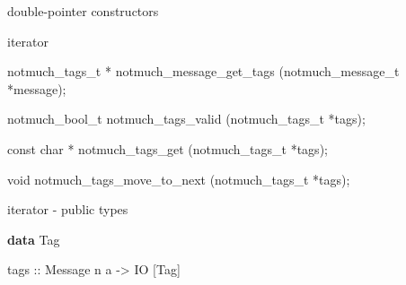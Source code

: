 \documentclass[ignorenonframetext,aspectratio=169]{beamer}
\newenvironment{Shaded}{}{}
\newcommand{\KeywordTok}[1]{\textcolor[rgb]{0.00,0.44,0.13}{\textbf{{#1}}}}
\newcommand{\DataTypeTok}[1]{\textcolor[rgb]{0.56,0.13,0.00}{{#1}}}
\newcommand{\DecValTok}[1]{\textcolor[rgb]{0.25,0.63,0.44}{{#1}}}
\newcommand{\StringTok}[1]{\textcolor[rgb]{0.25,0.44,0.63}{{#1}}}
\newcommand{\OtherTok}[1]{\textcolor[rgb]{0.00,0.44,0.13}{{#1}}}
\newcommand{\FunctionTok}[1]{\textcolor[rgb]{0.02,0.16,0.49}{{#1}}}
\newcommand{\NormalTok}[1]{{#1}}
\begin{document}
\begin{frame}[fragile]{double-pointer constructors}

\begin{Shaded}
\end{Shaded}

\end{frame}

\begin{frame}[fragile]{iterator}

\begin{Shaded}
\begin{Highlighting}[]
\NormalTok{notmuch_tags_t *}
\NormalTok{notmuch_message_get_tags (notmuch_message_t *message);}

\NormalTok{notmuch_bool_t}
\NormalTok{notmuch_tags_valid (notmuch_tags_t *tags);}

\DataTypeTok{const} \DataTypeTok{char} \NormalTok{*}
\NormalTok{notmuch_tags_get (notmuch_tags_t *tags);}

\DataTypeTok{void}
\NormalTok{notmuch_tags_move_to_next (notmuch_tags_t *tags);}
\end{Highlighting}
\end{Shaded}

\end{frame}

\begin{frame}[fragile]{iterator - public types}

\begin{Shaded}
\begin{Highlighting}[]
\KeywordTok{data} \DataTypeTok{Tag}

\OtherTok{tags ::} \DataTypeTok{Message} \NormalTok{n a }\OtherTok{->} \DataTypeTok{IO} \NormalTok{[}\DataTypeTok{Tag}\NormalTok{]}
\end{Highlighting}
\end{Shaded}

\end{frame}
\end{document}

